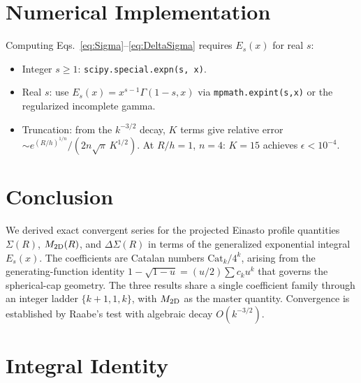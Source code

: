 \documentclass{article}
\begin{document}
\section{Numerical Implementation}
\label{sec:numerics}

Computing Eqs.~\eqref{eq:Sigma}--\eqref{eq:DeltaSigma} requires $E_s(x)$ for
real $s$:
\begin{itemize}
\item Integer $s\ge1$: \texttt{scipy.special.expn(s, x)}.
\item Real $s$: use $E_s(x)=x^{s-1}\Gamma(1-s,x)$ via
\texttt{mpmath.expint(s,x)} or the regularized incomplete gamma.
\item Truncation: from the $k^{-3/2}$ decay, $K$ terms give relative error
$\sim e^{(R/h)^{1/n}}/(2n\sqrt\pi\,K^{1/2})$.  At $R/h=1$, $n=4$: $K=15$
achieves $\epsilon<10^{-4}$.
\end{itemize}

\section{Conclusion}
\label{sec:conclusion}

We derived exact convergent series for the projected Einasto profile quantities
$\Sigma(R)$, $M_{\rm 2D}(R)$, and $\Delta\Sigma(R)$ in terms of the
generalized exponential integral $E_s(x)$.  The coefficients are Catalan
numbers $\mathrm{Cat}_k/4^k$, arising from the generating-function identity
$1-\sqrt{1-u}=(u/2)\sum c_k u^k$ that governs the spherical-cap geometry.
The three results share a single coefficient family through an integer ladder
$\{k+1,1,k\}$, with $M_{\rm 2D}$ as the master quantity.  Convergence is
established by Raabe's test with algebraic decay $O(k^{-3/2})$.

\appendix
\section{Integral Identity}
\label{app:integral}
\end{document}
